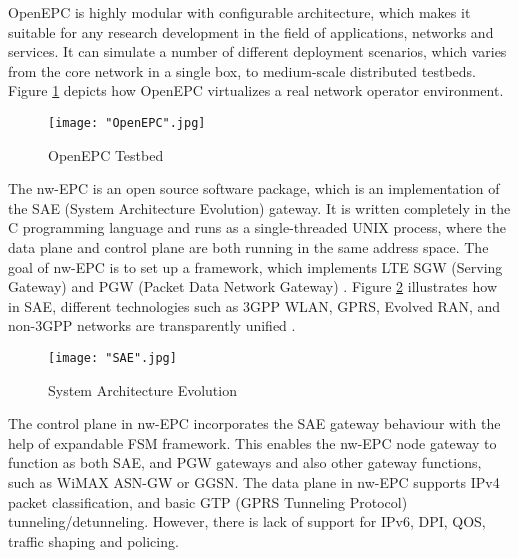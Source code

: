 OpenEPC is highly modular with configurable architecture, which makes it suitable for any research development in the field of applications, networks and services. It can simulate a number of  different deployment scenarios, which varies from the core network in a single box, to medium-scale distributed testbeds. Figure \ref{fig:OpenEPC} depicts how OpenEPC virtualizes a real network operator environment.  

\begin{figure}[h!t]
\centering
{}
\texttt{[image: "OpenEPC".jpg]}
\caption{OpenEPC Testbed \cite{OpenEPC}}
\label{fig:OpenEPC}
\end{figure}

The nw-EPC is an open source software package, which is an implementation of the SAE (System Architecture Evolution) gateway. It is written completely in the C programming language and runs as a single-threaded UNIX process, where the data plane and control plane are both running in the same address space. The goal of nw-EPC is to set up a framework, which implements LTE SGW (Serving Gateway) and PGW (Packet Data Network Gateway) \cite{nwEPC}. Figure \ref{fig:SAE} illustrates how in SAE, different technologies such as 3GPP WLAN, GPRS, Evolved RAN, and non-3GPP networks are transparently unified \cite{SAE}.

\begin{figure}[h!t]
\centering
{}
\texttt{[image: "SAE".jpg]}
\caption{System Architecture Evolution \cite{SAE}}
\label{fig:SAE}
\end{figure}

The control plane in nw-EPC incorporates the SAE gateway behaviour with the help of expandable FSM framework. This enables the nw-EPC node gateway to function as both SAE, and PGW gateways and also other gateway functions, such as WiMAX ASN-GW or GGSN. The data plane in nw-EPC supports IPv4 packet classification, and basic GTP (GPRS Tunneling Protocol) tunneling/detunneling. However, there is lack of support for IPv6, DPI, QOS, traffic shaping and policing.  

\clearpage
